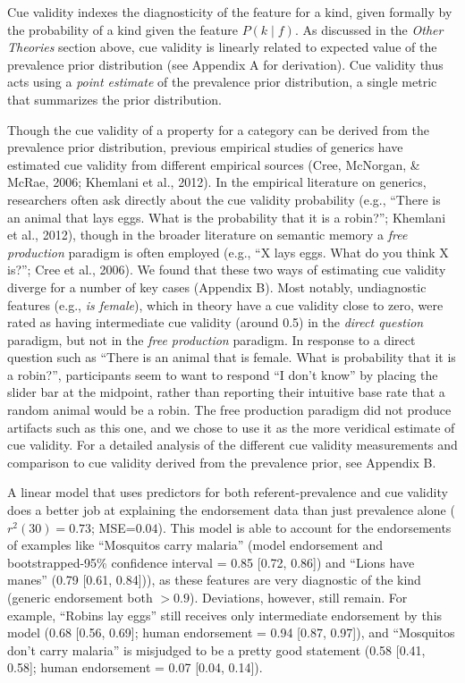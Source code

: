 \documentclass[english,,man,floatsintext]{apa6}
\theoremstyle{definition}
\theoremstyle{definition}
\theoremstyle{definition}
\theoremstyle{remark}
\begin{document}
Cue validity indexes the diagnosticity of the feature for a kind, given
formally by the probability of a kind given the feature \(P(k \mid f)\).
As discussed in the \emph{Other Theories} section above, cue validity is
linearly related to expected value of the prevalence prior distribution
(see Appendix A for derivation). Cue validity thus acts using a
\emph{point estimate} of the prevalence prior distribution, a single
metric that summarizes the prior distribution.

Though the cue validity of a property for a category can be derived from
the prevalence prior distribution, previous empirical studies of
generics have estimated cue validity from different empirical sources
(Cree, McNorgan, \& McRae, 2006; Khemlani et al., 2012). In the
empirical literature on generics, researchers often ask directly about
the cue validity probability (e.g., ``There is an animal that lays eggs.
What is the probability that it is a robin?''; Khemlani et al., 2012),
though in the broader literature on semantic memory a \emph{free
production} paradigm is often employed (e.g., ``X lays eggs. What do you
think X is?''; Cree et al., 2006). We found that these two ways of
estimating cue validity diverge for a number of key cases (Appendix B).
Most notably, undiagnostic features (e.g., \emph{is female}), which in
theory have a cue validity close to zero, were rated as having
intermediate cue validity (around 0.5) in the \emph{direct question}
paradigm, but not in the \emph{free production} paradigm. In response to
a direct question such as \enquote{There is an animal that is female.
What is probability that it is a robin?}, participants seem to want to
respond \enquote{I don't know} by placing the slider bar at the
midpoint, rather than reporting their intuitive base rate that a random
animal would be a robin. The free production paradigm did not produce
artifacts such as this one, and we chose to use it as the more veridical
estimate of cue validity. For a detailed analysis of the different cue
validity measurements and comparison to cue validity derived from the
prevalence prior, see Appendix B.

A linear model that uses predictors for both referent-prevalence and cue
validity does a better job at explaining the endorsement data than just
prevalence alone (\(r^2(30) = 0.73\); MSE=\(0.04\)). This model is able
to account for the endorsements of examples like \enquote{Mosquitos
carry malaria} (model endorsement and bootstrapped-95\% confidence
interval = 0.85 {[}0.72, 0.86{]}) and \enquote{Lions have manes} (0.79
{[}0.61, 0.84{]})), as these features are very diagnostic of the kind
(generic endorsement both \(> 0.9\)). Deviations, however, still remain.
For example, \enquote{Robins lay eggs} still receives only intermediate
endorsement by this model (0.68 {[}0.56, 0.69{]}; human endorsement =
0.94 {[}0.87, 0.97{]}), and \enquote{Mosquitos don't carry malaria} is
misjudged to be a pretty good statement (0.58 {[}0.41, 0.58{]}; human
endorsement = 0.07 {[}0.04, 0.14{]}).
\end{document}
